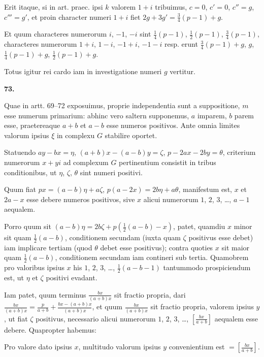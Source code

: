 \documentclass[12pt,a4paper]{article}
\theoremstyle{plain}
\theoremstyle{definition}
\theoremstyle{remark}
\begin{document}
Erit itaque, si in art. praec. ipsi $k$ valorem $1+i$ tribuimus, $c = 0$, $c' = 0$, $c'' = g$, $c''' = g'$, et proin character numeri $1+i$ fiet $2g + 3g' = \frac{3}{4}(p-1) + g$.

Et quum characteres numerorum $i$, $-1$, $-i$ sint $\frac{1}{4}(p-1)$, $\frac{1}{2}(p-1)$, $\frac{3}{4}(p-1)$, characteres numerorum $1+i$, $1-i$, $-1+i$, $-1-i$ resp. erunt $\frac{3}{4}(p-1)+g$, $g$, $\frac{1}{4}(p-1)+g$, $\frac{1}{2}(p-1)+g$.

Totus igitur rei cardo iam in investigatione numeri $g$ vertitur.

\bigskip

\noindent\textbf{73.}

Quae in artt. 69--72 exposuimus, proprie independentia sunt a suppositione, $m$ esse numerum primarium: abhinc vero saltern supponemus, $a$ imparem, $b$ parem esse, praetereaque $a+b$ et $a-b$ esse numeros positivos. Ante omnia limites valorum ipsius $\xi$ in complexu $G$ stabilire oportet.

Statuendo $ay - bx = \eta$, $(a+b)x - (a-b)y = \zeta$, $p - 2ax - 2by = \theta$, criterium numerorum $x+yi$ ad complexum $G$ pertinentium consistit in tribus conditionibus, ut $\eta$, $\zeta$, $\theta$ sint numeri positivi.

Quum fiat $px = (a-b)\eta + a\zeta$, $p(a-2x) = 2b\eta + a\theta$, manifestum est, $x$ et $2a - x$ esse debere numeros positivos, sive $x$ alicui numerorum $1$, $2$, $3$, \ldots, $a-1$ aequalem.

Porro quum sit $(a-b)\eta = 2b\zeta + p(\frac{1}{2}(a-b) - x)$, patet, quamdiu $x$ minor sit quam $\frac{1}{2}(a-b)$, conditionem secundam (iuxta quam $\zeta$ positivus esse debet) iam implicare tertiam (quod $\theta$ debet esse positivus); contra quoties $x$ sit maior quam $\frac{1}{2}(a-b)$, conditionem secundam iam contineri sub tertia. Quamobrem pro valoribus ipsius $x$ his $1$, $2$, $3$, \ldots, $\frac{1}{2}(a-b-1)$ tantummodo prospiciendum est, ut $\eta$ et $\zeta$ positivi evadant.

Iam patet, quum terminus $\frac{bx}{(a+b)x}$ sit fractio propria, dari $\frac{bx}{(a+b)x} = \frac{p}{a+b} + \frac{bx - (a+b)x}{(a+b)x}$, et quum $\frac{bx}{(a+b)x}$ sit fractio propria, valorem ipsius $y$, ut fiat $\zeta$ positivus, necessario alicui numerorum $1$, $2$, $3$, \ldots, $\left[\frac{bx}{a+b}\right]$ aequalem esse debere. Quapropter habemus:

Pro valore dato ipsius $x$, multitudo valorum ipsius $y$ convenientium est $= \left[\frac{bx}{a+b}\right]$.
\end{document}
